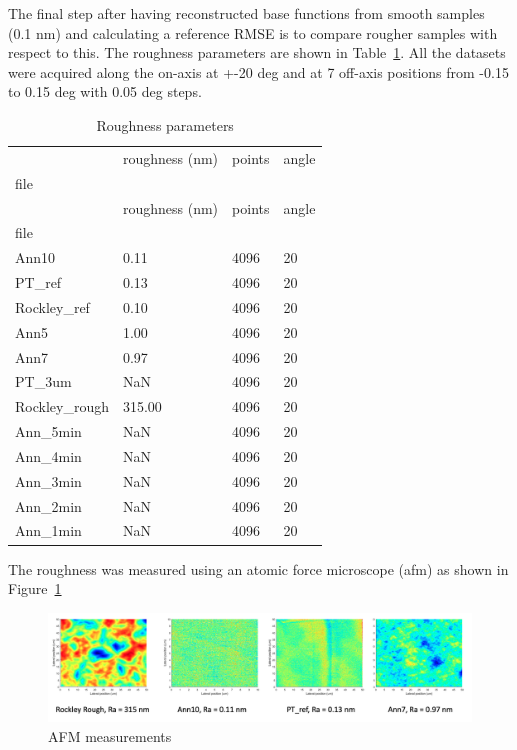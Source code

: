 \documentclass[
  letterpaper,
  DIV=11,
  numbers=noendperiod,
  oneside]{scrreprt}
\begin{document}
The final step after having reconstructed base functions from smooth
samples (0.1 nm) and calculating a reference RMSE is to compare rougher
samples with respect to this. The roughness parameters are shown in
Table~\ref{tbl-2}. All the datasets were acquired along the on-axis at
+-20 deg and at 7 off-axis positions from -0.15 to 0.15 deg with 0.05
deg steps.

\hypertarget{tbl-2}{}
\begin{longtable}[]{@{}llll@{}}
\caption{\label{tbl-2}Roughness parameters}\tabularnewline
\toprule\noalign{}
& roughness (nm) & points & angle \\
file & & & \\
\midrule\noalign{}
\endfirsthead
\toprule\noalign{}
& roughness (nm) & points & angle \\
file & & & \\
\midrule\noalign{}
\endhead
\bottomrule\noalign{}
\endlastfoot
Ann10 & 0.11 & 4096 & 20 \\
PT\_ref & 0.13 & 4096 & 20 \\
Rockley\_ref & 0.10 & 4096 & 20 \\
Ann5 & 1.00 & 4096 & 20 \\
Ann7 & 0.97 & 4096 & 20 \\
PT\_3um & NaN & 4096 & 20 \\
Rockley\_rough & 315.00 & 4096 & 20 \\
Ann\_5min & NaN & 4096 & 20 \\
Ann\_4min & NaN & 4096 & 20 \\
Ann\_3min & NaN & 4096 & 20 \\
Ann\_2min & NaN & 4096 & 20 \\
Ann\_1min & NaN & 4096 & 20 \\
\end{longtable}

The roughness was measured using an atomic force microscope (afm) as
shown in Figure~\ref{fig-afm}

\begin{figure}

{\centering \includegraphics{notebooks/figures/d/afm.png}

}

\caption{\label{fig-afm}AFM measurements}

\end{figure}
\end{document}
